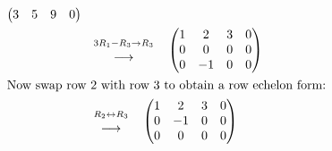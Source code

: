 \documentclass{ximera}
\begin{document}
\begin{example}
\begin{explanation}
\begin{enumerate}
\begin{align*}
\begin{pmatrix}
          3 & 5 & 9 & 0
        \end{pmatrix} \\
        & \quad
        \begin{matrix}
          \scriptstyle 3R_1 - R_3 \to R_3 \\
          \longrightarrow
        \end{matrix}
        \quad
        \begin{pmatrix}
          1 & 2 & 3 & 0 \\
          0 & 0 & 0 & 0 \\
          0 & -1 & 0 & 0
        \end{pmatrix} \\
        \intertext{Now swap row $2$ with row $3$ to obtain a row echelon form:}
        & \quad
        \begin{matrix}
          \scriptstyle R_2 \leftrightarrow R_3 \\
          \longrightarrow
        \end{matrix}
        \quad
        \begin{pmatrix}
          1 & 2 & 3 & 0 \\
          0 & -1 & 0 & 0 \\
          0 & 0 & 0 & 0
        \end{pmatrix}
      \end{align*}


\end{enumerate}
\end{explanation}
\end{example}
\end{document}
